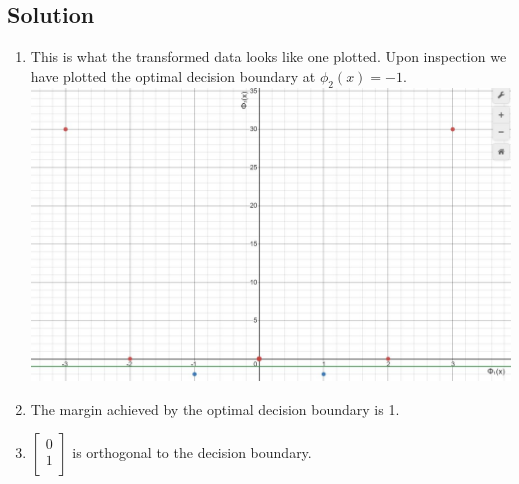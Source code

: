 \documentclass[submit]{harvardml}
\begin{document}
\newpage

\subsection*{Solution}

\begin{enumerate}
    \item This is what the transformed data looks like one plotted. Upon inspection we have plotted the optimal decision boundary at $\phi_{2}(x)= -1$. \newline
    \includegraphics[scale=.50]{hw4/Pics/graph1_hw4.JPG}
    
    \item The margin achieved by the optimal decision boundary is 1.
    
    \item $\begin{bmatrix}
           0 \\
           1 \\
         \end{bmatrix}$
         is orthogonal to the decision boundary. 
         

\end{enumerate}
\end{document}
